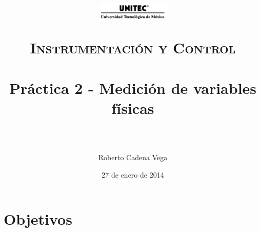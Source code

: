 



\title{	
	\normalfont \normalsize
	\begin{figure}[h]
		\begin{center}
			\includegraphics[width=0.3\textwidth]{UNITEC.png} %
		\end{center}
	\end{figure}
	\textsc{Instrumentación y Control} \\ [25pt]
	\horrule{0.5pt} \\[0.4cm] %
	\huge Práctica 2 - Medición de variables físicas \\ %
	\horrule{2pt} \\[0.5cm] %
}

\author{Roberto Cadena Vega} %

\date{\normalsize 27 de enero de 2014} %




\maketitle %


\section{Objetivos}

